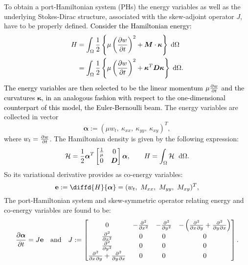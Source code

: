 \documentclass[11pt]{article}
\newcommand{\revOne}[1]{\textcolor{black}{#1}}
\begin{document}
	To obtain a port-Hamiltonian system (PHs) the energy variables as well as the underlying Stokes-Dirac structure, associated with the skew-adjoint operator $J$, have to be properly defined. \revOne{Consider the Hamiltonian energy:
		\begin{equation}
		\begin{aligned}
		H &=  \int_{\Omega} \frac{1}{2} \left\{ \mu \left(\diffp{w}{t}\right)^2 + \bm{M} \cdot \bm{\kappa} \right\} \d{\Omega} \\
		&=  \int_{\Omega} \frac{1}{2} \left\{ \mu \left(\diffp{w}{t}\right)^2 + \bm{\kappa}^T \bm{D} \bm{\kappa} \right\} \d{\Omega}.
		\end{aligned}
		\end{equation} 
		The energy variables are then selected to be the linear momentum $\mu \diffp{w}{t}$ and the curvatures $\bm\kappa$, in an analogous fashion with respect to the one-dimensional counterpart of this model, the Euler-Bernoulli beam.} The energy variables are collected in  vector
	\begin{equation}
	\bm{\alpha} := (\mu w_t,\ \kappa_{xx},\ \kappa_{yy},\ \kappa_{xy})^T,
	\end{equation}
	where $w_t = \diffp{w}{t}$. The Hamiltonian density is given by the following expression:
	\begin{equation}
	\label{eq:H_kir}
	\mathcal{H} = \frac{1}{2} \bm{\alpha}^T \begin{bmatrix}
	\frac{1}{\mu} & 0 \\
	0 & \bm{D} \\
	\end{bmatrix} \bm{\alpha},  \qquad H = \int_{\Omega} \mathcal{H} \ \d{\Omega}.
	\end{equation}
	So its variational derivative provides as co-energy variables:
	\begin{equation}
	\mathbf{e} := \diffd{H}{\bm{\alpha}} = (w_t,\ M_{xx},\ M_{yy},\ M_{xy})^T,
	\end{equation}
	The port-Hamiltonian system and skew-symmetric operator relating energy and co-energy variables are found to be:
	\begin{equation}
	\label{eq:PH_Kirchh}
	\diffp{\bm{\alpha}}{t} = J \mathbf{e} \quad \text{and} \quad J := 
	\begin{bmatrix}
	0 & -\diffp[2]{}{x} & -\diffp[2]{}{y} & - \left(\diffp{}{x,y} + \diffp{}{y,x} \right)\\
	\diffp[2]{}{x} & 0 & 0 & 0 \\
	\diffp[2]{}{y} & 0 & 0 & 0 \\
	\diffp{}{x,y} +  \diffp{}{y,x} & 0 & 0 & 0 \\
	\end{bmatrix}.
	\end{equation}
\end{document}
